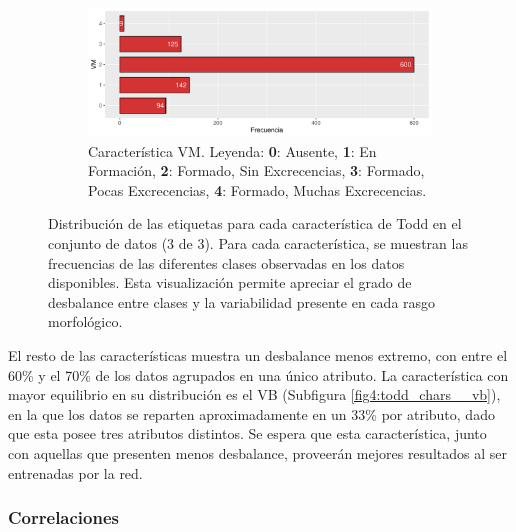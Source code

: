 \begin{figure}[p]
    \begin{subfigure}{\textwidth}
        \includegraphics[width=\linewidth]{../../scripts/eda/eda_univar/char_vm_distr.pdf}
        \caption{Característica VM. Leyenda: \textbf{0}: Ausente, \textbf{1}: En Formación, \textbf{2}: Formado, Sin Excrecencias, \textbf{3}: Formado, Pocas Excrecencias, \textbf{4}: Formado, Muchas Excrecencias.}
        \label{fig4:todd_chars__vm}
    \end{subfigure}
    \caption[Distribución de las características de Todd (3 de 3)]{Distribución de las etiquetas para cada característica de Todd en el conjunto de datos (3 de 3). Para cada característica, se muestran las frecuencias de las diferentes clases observadas en los datos disponibles. Esta visualización permite apreciar el grado de desbalance entre clases y la variabilidad presente en cada rasgo morfológico.}
    \label{fig4:todd_chars_3}


\end{figure}

El resto de las características muestra un desbalance menos extremo, con entre el 60\% y el 70\% de los datos agrupados en una único atributo. La característica con mayor equilibrio en su distribución es el VB (Subfigura \ref{fig4:todd_chars__vb}), en la que los datos se reparten aproximadamente en un 33\% por atributo, dado que esta posee tres atributos distintos. Se espera que esta característica, junto con aquellas que presenten menos desbalance, proveerán mejores resultados al ser entrenadas por la red.

\subsubsection{Correlaciones}

